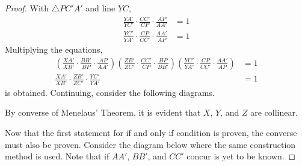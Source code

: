 \documentclass[../../../main.tex]{subfiles}
\begin{document}
\begin{proof}
With $\triangle{PC'A'}$ and line $YC$,
\begin{align*}
    \frac{YA'}{YC'} \cdot \frac{CC'}{CP}
    \cdot \frac{AP}{AA'}
    &= 1 \\
    \frac{YC'}{YA'} \cdot \frac{CP}{CC'}
    \cdot \frac{AA'}{AP}
    &= 1
\end{align*}
Multiplying the equations,
\begin{align*}
    \left( \frac{XA'}{XB'} \cdot \frac{BB'}{BP}
        \cdot \frac{AP}{AA'} \right)
    \left( \frac{ZB'}{ZC'} \cdot \frac{CC'}{CP}
        \cdot \frac{BP}{BB'} \right)
    \left( \frac{YC'}{YA'} \cdot \frac{CP}{CC'}
        \cdot \frac{AA'}{AP} \right)
    &= 1 \\
    \frac{XA'}{XB'} \cdot \frac{ZB'}{ZC'} \cdot
    \frac{YC'}{YA'}
    &= 1
\end{align*}
is obtained. Continuing, consider the following diagrams.

\begin{center}
\end{center}

By converse of Menelaus' Theorem, it is evident that $X$, $Y$, and
$Z$ are collinear.

Now that the first statement for if and only if condition is proven,
the converse must also be proven. Consider the diagram below where the
same construction method is used. Note that if $AA'$, $BB'$, and $CC'$
concur is yet to be known.


\end{proof}
\end{document}
